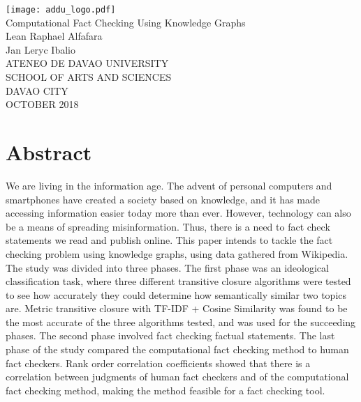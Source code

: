 \documentclass[10pt,11pt,12pt,oneside]{book}
\begin{document}
\cleardoublepage
\begin{titlepage}
    \begin{center}
        \texttt{[image: addu\_logo.pdf]}\\
        \vspace{1cm}
        \huge{Computational Fact Checking Using Knowledge Graphs}\\
        \vspace{1.5in}
        \large{Lean Raphael Alfafara\\Jan Leryc Ibalio}\\
        \vspace{1.5in}
        \large{ATENEO DE DAVAO UNIVERSITY\\SCHOOL OF ARTS AND SCIENCES\\DAVAO CITY}\\
        \vspace{1in}
        OCTOBER 2018
    \end{center}
\end{titlepage}

\frontmatter
\chapter*{Abstract}
We are living in the information age. The advent of personal computers and smartphones have created a society based on knowledge, and it has made accessing information easier today more than ever. However, technology can also be a means of spreading misinformation. Thus, there is a need to fact check statements we read and publish online. This paper intends to tackle the fact checking problem using knowledge graphs, using data gathered from Wikipedia. The study was divided into three phases. The first phase was an ideological classification task, where three different transitive closure algorithms were tested to see how accurately they could determine how semantically similar two topics are. Metric transitive closure with TF-IDF + Cosine Similarity was found to be the most accurate of the three algorithms tested, and was used for the succeeding phases. The second phase involved fact checking factual statements. The last phase of the study compared the computational fact checking method to human fact checkers. Rank order correlation coefficients showed that there is a correlation between judgments of human fact checkers and of the computational fact checking method, making the method feasible for a fact checking tool.\\
\end{document}
